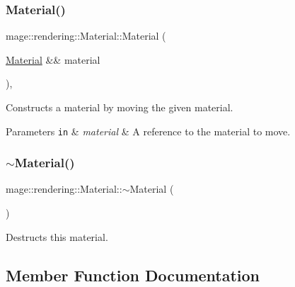 \subsubsection{\texorpdfstring{Material()}{Material()}\hspace{0.1cm}{\footnotesize\ttfamily [3/3]}}
{\footnotesize\ttfamily mage\+::rendering\+::\+Material\+::\+Material (\begin{DoxyParamCaption}\item[{\hyperlink{classmage_1_1rendering_1_1_material}{Material} \&\&}]{material }\end{DoxyParamCaption})\hspace{0.3cm}{\ttfamily [default]}, {\ttfamily [noexcept]}}

Constructs a material by moving the given material.


\begin{DoxyParams}[1]{Parameters}
\mbox{\tt in}  & {\em material} & A reference to the material to move. \\
\hline
\end{DoxyParams}
\hypertarget{classmage_1_1rendering_1_1_material_a0dcdba799e013b2a8ff0108b14b9a73c}{}\label{classmage_1_1rendering_1_1_material_a0dcdba799e013b2a8ff0108b14b9a73c} 
\subsubsection{\texorpdfstring{$\sim$\+Material()}{~Material()}}
{\footnotesize\ttfamily mage\+::rendering\+::\+Material\+::$\sim$\+Material (\begin{DoxyParamCaption}{ }\end{DoxyParamCaption})\hspace{0.3cm}{\ttfamily [default]}}

Destructs this material. 

\subsection{Member Function Documentation}
\hypertarget{classmage_1_1rendering_1_1_material_a9dd92f97dbae7cfbdae55759c20f6887}{}\label{classmage_1_1rendering_1_1_material_a9dd92f97dbae7cfbdae55759c20f6887} 
